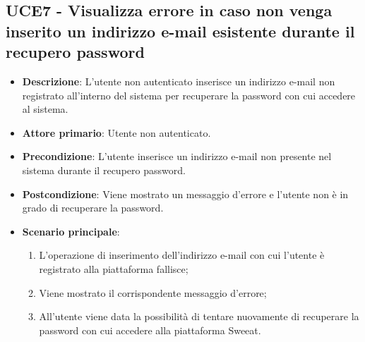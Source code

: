 \subsection{UCE7 - Visualizza errore in caso non venga inserito un indirizzo e-mail esistente durante il recupero password}
\begin{itemize}
\item \textbf{Descrizione}: L'utente non autenticato inserisce un indirizzo e-mail non registrato all'interno del sistema per recuperare la password con cui accedere al sistema.
\item \textbf{Attore primario}: Utente non autenticato.
\item \textbf{Precondizione}: L'utente inserisce un indirizzo e-mail non presente nel sistema durante il recupero password.
\item \textbf{Postcondizione}: Viene mostrato un messaggio d'errore e l'utente non è in grado di recuperare la password.

\item \textbf{Scenario principale}:
\begin{enumerate}
\item L'operazione di inserimento dell'indirizzo e-mail con cui l'utente è registrato alla piattaforma fallisce;
\item Viene mostrato il corrispondente messaggio d'errore;
\item All'utente viene data la possibilità di tentare nuovamente di recuperare la password con cui accedere alla piattaforma Sweeat.
\end{enumerate}
\end{itemize}